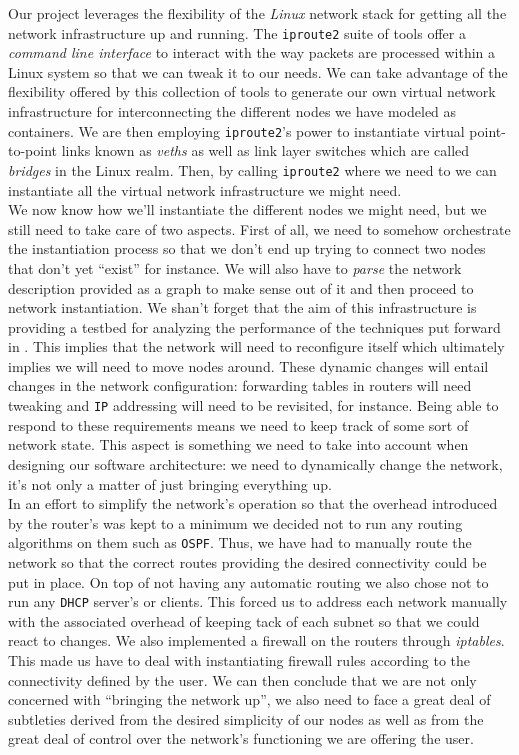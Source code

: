 \documentclass[12pt]{article}
\begin{document}
        Our project leverages the flexibility of the \textit{Linux} network stack for getting all the network infrastructure up and running. The \texttt{iproute2} suite of tools offer a \textit{command line interface} to interact with the way packets are processed within a Linux system so that we can tweak it to our needs. We can take advantage of the flexibility offered by this collection of tools to generate our own virtual network infrastructure for interconnecting the different nodes we have modeled as containers. We are then employing \texttt{iproute2}'s power to instantiate virtual point-to-point links known as \textit{veths} as well as link layer switches which are called \textit{bridges} in the Linux realm. Then, by calling \texttt{iproute2} where we need to we can instantiate all the virtual network infrastructure we might need.\\

        We now know how we'll instantiate the different nodes we might need, but we still need to take care of two aspects. First of all, we need to somehow orchestrate the instantiation process so that we don't end up trying to connect two nodes that don't yet ``exist'' for instance. We will also have to \textit{parse} the network description provided as a graph to make sense out of it and then proceed to network instantiation. We shan't forget that the aim of this infrastructure is providing a testbed for analyzing the performance of the techniques put forward in \cite{bib:REACT}. This implies that the network will need to reconfigure itself which ultimately implies we will need to move nodes around. These dynamic changes will entail changes in the network configuration: forwarding tables in routers will need tweaking and \texttt{IP} addressing will need to be revisited, for instance. Being able to respond to these requirements means we need to keep track of some sort of network state. This aspect is something we need to take into account when designing our software architecture: we need to dynamically change the network, it's not only a matter of just bringing everything up.\\

        In an effort to simplify the network's operation so that the overhead introduced by the router's was kept to a minimum we decided not to run any routing algorithms on them such as \texttt{OSPF}. Thus, we have had to manually route the network so that the correct routes providing the desired connectivity could be put in place. On top of not having any automatic routing we also chose not to run any \texttt{DHCP} server's or clients. This forced us to address each network manually with the associated overhead of keeping tack of each subnet so that we could react to changes. We also implemented a firewall on the routers through \textit{iptables}. This made us have to deal with instantiating firewall rules according to the connectivity defined by the user. We can then conclude that we are not only concerned with ``bringing the network up'', we also need to face a great deal of subtleties derived from the desired simplicity of our nodes as well as from the great deal of control over the network's functioning we are offering the user.\\
\end{document}
